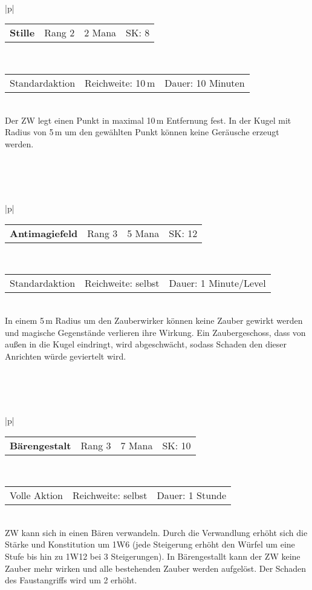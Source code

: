 \documentclass[../../Heldenanleitung2]{subfiles}
\begin{document}
\\\\\\
\begin{tabular}{|p{\textwidth}|}
\hline
\begin{tabularx}{\textwidth}{X|X|X|X}
\textbf{Stille} & Rang 2 & 2 Mana & SK: 8
\end{tabularx} \\ \hline
\begin{tabularx}{\textwidth}{X|X|X}
Standardaktion & Reichweite: 10\,m & Dauer: 10 Minuten
\end{tabularx} \\ \hline
Der ZW legt einen Punkt in maximal 10\,m Entfernung fest. In der Kugel mit Radius von 5\,m um den gewählten Punkt können keine Geräusche erzeugt werden.
\\ \hline
\end{tabular}
\\\\\\
\begin{tabular}{|p{\textwidth}|}
\hline
\begin{tabularx}{\textwidth}{X|X|X|X}
\textbf{Antimagiefeld} & Rang 3 & 5 Mana & SK: 12
\end{tabularx} \\ \hline
\begin{tabularx}{\textwidth}{X|X|X}
Standardaktion & Reichweite: selbst & Dauer: 1 Minute/Level
\end{tabularx} \\ \hline
In einem 5\,m Radius um den Zauberwirker können keine Zauber gewirkt werden und magische Gegenstände verlieren ihre Wirkung. Ein Zaubergeschoss, dass von außen in die Kugel eindringt, wird abgeschwächt, sodass Schaden den dieser Anrichten würde geviertelt wird.
\\ \hline
\end{tabular}
\\\\\\
\begin{tabular}{|p{\textwidth}|}
\hline
\begin{tabularx}{\textwidth}{X|X|X|X}
\textbf{Bärengestalt} & Rang 3 & 7 Mana & SK: 10
\end{tabularx} \\ \hline
\begin{tabularx}{\textwidth}{X|X|X}
Volle Aktion & Reichweite: selbst & Dauer: 1 Stunde
\end{tabularx} \\ \hline
ZW kann sich in einen Bären verwandeln. Durch die Verwandlung erhöht sich die Stärke und Konstitution um 1W6 (jede Steigerung erhöht den Würfel um eine Stufe bis hin zu 1W12 bei 3 Steigerungen). In Bärengestallt kann der ZW keine Zauber mehr wirken und alle bestehenden Zauber werden aufgelöst. Der Schaden des Faustangriffs wird um 2 erhöht.
\\ \hline
\end{tabular}
\end{document}
